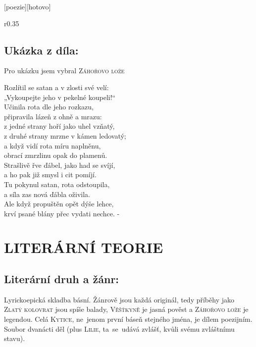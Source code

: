 \documentclass{extarticle} %
\begin{document}
\newpage


\changefontsize{7pt}

[poezie][hotovo]

\noindent\begin{wrapfigure}{r}{0.35\textwidth}
\tiny

\subsection*{Ukázka z díla:}
\setlength{\parindent}{3pt}
Pro ukázku jsem vybral \textsc{Záhořovo lože}
\begin{center}
\noindent
Rozlítil se satan a v zlosti své velí: \\
„Vykoupejte jeho v pekelné koupeli!“ \\
Učinila rota dle jeho rozkazu, \\
připravila lázeň z ohně a mrazu: \\
z jedné strany hoří jako uhel vzňatý, \\
z druhé strany mrzne v kámen ledovatý; \\
a když vidí rota míru naplněnu, \\
obrací zmrzlinu opak do plamenů. \\
Strašlivě řve ďábel, jako had se svíjí, \\
a ho pak již smysl i cit pomíjí. \\
Tu pokynul satan, rota odstoupila, \\
a síla zas nová ďábla oživila. \\
Ale když propuštěn opět dýše lehce, \\
krví psané blány přec vydati nechce. -
\end{center}
\vspace{3em}
\end{wrapfigure}

\section*{LITERÁRNÍ TEORIE}

\subsection*{Literární druh a žánr:}
\noindent 
Lyrickoepická skladba básní.
Žánrově jsou každá originál,
tedy příběhy jako \textsc{Zlatý kolovrat} jsou spíše balady,
\textsc{Věšťkyně} je jasná pověst
a \textsc{Záhořovo lože} je legendou.
Celá \textsc{Kytice}, ne~jenom první báseň stejného jména, je dílem poezijním.
Soubor dvanácti děl (plus \textsc{Lilie}, ta~se~udává zvlášť, kvůli svému zvláštnímu stavu).
\end{document}
